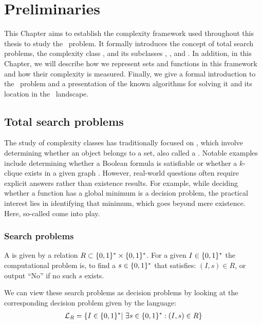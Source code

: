 \setchapterpreamble[u]{\margintoc}
\chapter{Preliminaries}

This Chapter aims to establish the complexity framework used throughout this thesis to study the \Tarski\ problem. It formally introduces the concept of total search problems, the complexity class \TFNP, and its subclasses \PLS, \PPAD, and \EOPL. In addition, in this Chapter, we will describe how we represent sets and functions in this framework and how their complexity is measured. Finally, we give a formal introduction to the \Tarski\ problem and a presentation of the known algorithms for solving it and its location in the \TFNP\ landscape.

\section{Total search problems}

The study of complexity classes has traditionally focused on , which involve determining whether an object belongs to a set, also called a . Notable examples include determining whether a Boolean formula is satisfiable or whether a $k$-clique exists in a given graph . However, real-world questions often require explicit answers rather than existence results. For example, while deciding whether a function has a global minimum is a decision problem, the practical interest lies in identifying that minimum, which goes beyond mere existence. Here, so-called  come into play.

\subsection{Search problems}

\begin{definition}
	A  is given by a relation $R\subset \{0, 1\}^* \times \{0, 1\}^*$. For a given  $I\in \{0, 1\}^*$ the computational problem is, to find a  $s \in \{0, 1\}^*$ that satisfies: $(I, s) \in R$, or output ``No'' if no such $s$ exists.
\end{definition}

We can view these search problems as decision problems by looking at the corresponding decision problem given by the language:
\begin{align*}
	\mathcal{L}_R = \{ I \in \{0, 1\}^* |\ \exists s \in \{0, 1\}^* : (I, s) \in R\}
\end{align*}

